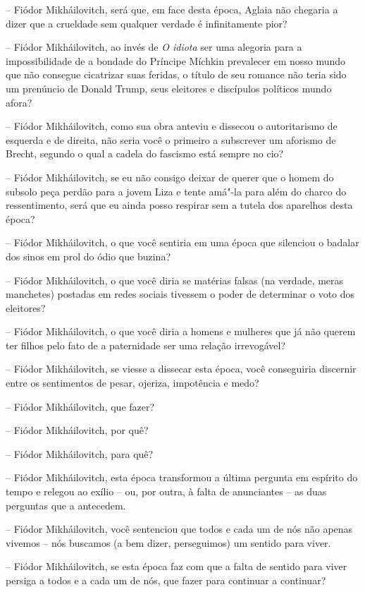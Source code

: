 -- Fiódor Mikháilovitch, será que, em face desta época, Aglaia não
chegaria a dizer que a crueldade sem qualquer verdade é infinitamente
pior?

-- Fiódor Mikháilovitch, ao invés de \emph{O idiota} ser uma alegoria
para a impossibilidade de a bondade do Príncipe Míchkin prevalecer em
nosso mundo que não consegue cicatrizar suas feridas, o título de seu
romance não teria sido um prenúncio de Donald Trump, seus eleitores e
discípulos políticos mundo afora?

-- Fiódor Mikháilovitch, como sua obra anteviu e dissecou o
autoritarismo de esquerda e de direita, não seria você o primeiro a
subscrever um aforismo de Brecht, segundo o qual a cadela do fascismo
está sempre no cio?

-- Fiódor Mikháilovitch, se eu não consigo deixar de querer que o homem
do subsolo peça perdão para a jovem Liza e tente amá"-la para além do
charco do ressentimento, será que eu ainda posso respirar sem a tutela
dos aparelhos desta época?

-- Fiódor Mikháilovitch, o que você sentiria em uma época que silenciou
o badalar dos sinos em prol do ódio que buzina?

-- Fiódor Mikháilovitch, o que você diria se matérias falsas (na
verdade, meras manchetes) postadas em redes sociais tivessem o poder de
determinar o voto dos eleitores?

-- Fiódor Mikháilovitch, o que você diria a homens e mulheres que já não
querem ter filhos pelo fato de a paternidade ser uma relação
irrevogável?

-- Fiódor Mikháilovitch, se viesse a dissecar esta época, você
conseguiria discernir entre os sentimentos de pesar, ojeriza, impotência
e medo?

-- Fiódor Mikháilovitch, que fazer?

-- Fiódor Mikháilovitch, por quê?

-- Fiódor Mikháilovitch, para quê?

-- Fiódor Mikháilovitch, esta época transformou a última pergunta em
espírito do tempo e relegou ao exílio -- ou, por outra, à falta de
anunciantes -- as duas perguntas que a antecedem.

-- Fiódor Mikháilovitch, você sentenciou que todos e cada um de nós não
apenas vivemos -- nós buscamos (a bem dizer, perseguimos) um sentido
para viver.

-- Fiódor Mikháilovitch, se esta época faz com que a falta de sentido
para viver persiga a todos e a cada um de nós, que fazer para continuar
a continuar?

